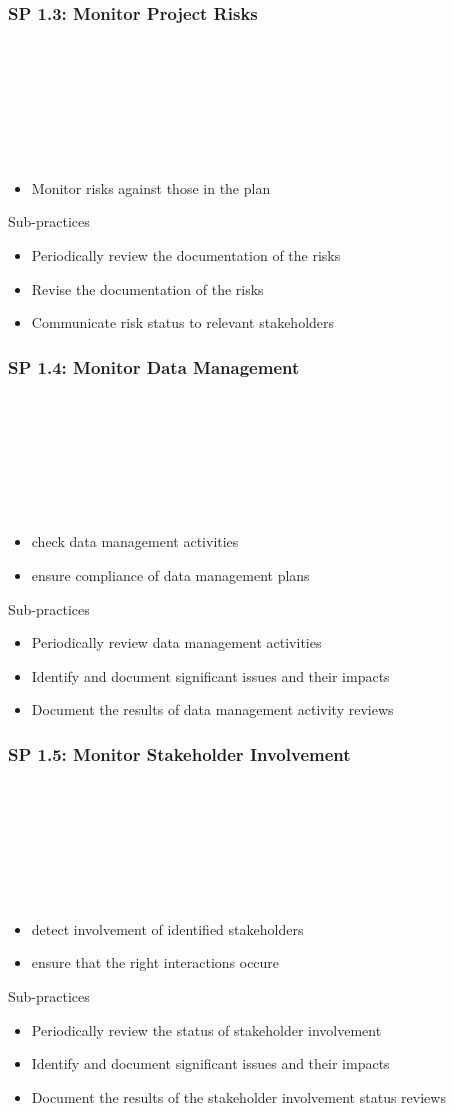 \documentclass[accentcolor=tud1b]{tudbeamer}
\newcommand{\strong}[1]{\textaccentcolor{\textsf{\textbf{#1}}}}
\newenvironment*{tframe}[1][]{%
	\begin{frame}
	\ifnum\Level=2
		\frametitle{\insertsectionhead\\\strong{#1}}
	\fi\ifnum\Level=3
		\frametitle{\insertsectionhead\\\strong{\insertsubsectionhead} \textnormal{#1}}
	\fi\ifnum\Level=4
		\frametitle{\insertsubsectionhead\\\strong{\insertsubsubsectionhead} #1}
	\fi
}{%
	\end{frame}
}
\newenvironment{listblock}[1]{%
	\begin{block}{#1}
		\begin{itemize}
}{%
		\end{itemize}
	\end{block}
}
\begin{document}
\subsubsection{SP 1.3: Monitor Project Risks}
\begin{tframe}
	\begin{itemize}
		\item Monitor risks against those in the plan
	\end{itemize}
	\begin{listblock}{Sub-practices}
		\item Periodically review the documentation of the risks
		\item Revise the documentation of the risks
		\item Communicate risk status to relevant stakeholders
	\end{listblock}
\end{tframe}

\subsubsection{SP 1.4: Monitor Data Management}
\begin{tframe}
	\begin{itemize}
		\item check data management activities
		\item ensure compliance of data management plans
	\end{itemize}
	\begin{listblock}{Sub-practices}
		\item Periodically review data management activities
		\item Identify and document significant issues and their impacts
		\item Document the results of data management activity reviews
	\end{listblock}
\end{tframe}

\subsubsection{SP 1.5: Monitor Stakeholder Involvement}
\begin{tframe}
	\begin{itemize}
		\item detect involvement of identified stakeholders 
		\item ensure that the right interactions occure
	\end{itemize}
	\begin{listblock}{Sub-practices}
		\item Periodically review the status of stakeholder involvement
		\item Identify and document significant issues and their impacts
		\item Document the results of the stakeholder involvement status reviews
	\end{listblock}
\end{tframe}
\end{document}
